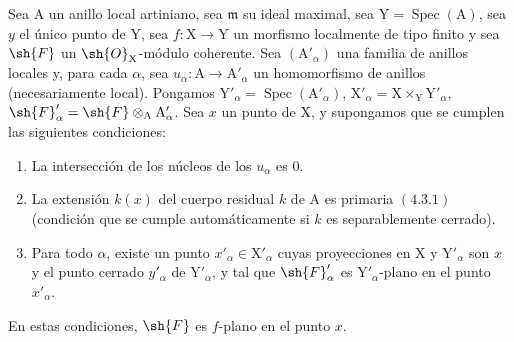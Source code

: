 \begin{proposition}[11.4.11]
\label{IV.11.4.11}
Sea $\mathrm{A}$ un anillo local artiniano, sea $\mathfrak{m}$ su ideal maximal,
sea $\mathrm{Y}=\operatorname{Spec}(\mathrm{A})$, sea $y$ el único punto de $\mathrm{Y}$, sea $f:\mathrm{X}\to\mathrm{Y}$ un morfismo localmente de tipo finito y sea $\sh{F}$ un
$\sh{O}_\mathrm{X}$-módulo coherente. Sea $(\mathrm{A}'_\alpha)$ una familia de anillos locales y, para cada $\alpha$, sea $u_\alpha:\mathrm{A}\to\mathrm{A}'_\alpha$
un homomorfismo de anillos (necesariamente local). Pongamos $\mathrm{Y}'_\alpha=\operatorname{Spec}(\mathrm{A}'_\alpha)$, $\mathrm{X}'_\alpha=\mathrm{X}\times_\mathrm{Y}\mathrm{Y}'_\alpha$,
$\sh{F}'_\alpha=\sh{F}\otimes_\mathrm{A}\mathrm{A}'_\alpha$. Sea $x$ un punto
de $\mathrm{X}$, y supongamos que se cumplen las siguientes condiciones:
\begin{enumerate}[label=(\roman*)]
  \item La intersección de los núcleos de los $u_\alpha$ es $0$.
  \item La extensión $k(x)$ del cuerpo residual $k$ de $\mathrm{A}$ es primaria $(4.3.1)$ (condición que se cumple automáticamente
  si $k$ es separablemente cerrado).
\end{enumerate}
\begin{enumerate}[label=(\roman*)]
  \setcounter{enumi}{2}
  \item Para todo $\alpha$, existe un punto $x'_\alpha\in\mathrm{X}'_\alpha$ cuyas proyecciones en $\mathrm{X}$ y $\mathrm{Y}'_\alpha$
  son $x$ y el punto cerrado $y'_\alpha$ de $\mathrm{Y}'_\alpha$, y tal que $\sh{F}'_\alpha$ es $\mathrm{Y}'_\alpha$-plano en el punto $x'_\alpha$.
\end{enumerate}

En estas condiciones, $\sh{F}$ es $f$-plano en el punto $x$.
\end{proposition}

